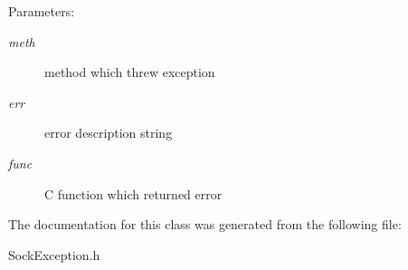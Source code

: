 \begin{Desc}
\item[Parameters:]
\begin{description}
\item[{\em meth}]method which threw exception \item[{\em err}]error description string \item[{\em func}]C function which returned error \end{description}
\end{Desc}


The documentation for this class was generated from the following file:\begin{CompactItemize}
\item 
SockException.h\end{CompactItemize}
